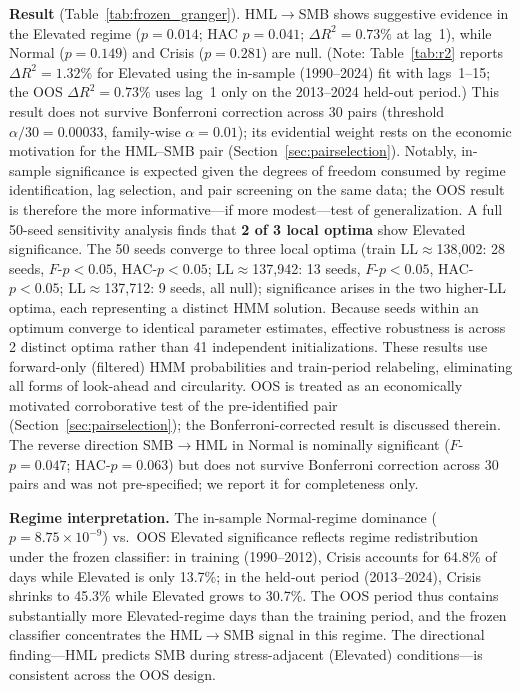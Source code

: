 \documentclass[sigconf,anonymous]{acmart}
\begin{document}
\textbf{Result} (Table~\ref{tab:frozen_granger}). HML$\to$SMB shows suggestive evidence in the Elevated regime
($p = 0.014$; HAC $p = 0.041$; $\Delta R^2 = 0.73\%$ at lag~1),
while Normal ($p = 0.149$) and Crisis ($p = 0.281$) are null.
(Note: Table~\ref{tab:r2} reports $\Delta R^2 = 1.32\%$ for Elevated using the
in-sample (1990--2024) fit with lags~1--15; the OOS $\Delta R^2 = 0.73\%$ uses
lag~1 only on the 2013--2024 held-out period.)
This result does not survive Bonferroni correction across 30 pairs
(threshold $\alpha/30 = 0.00033$, family-wise $\alpha = 0.01$); its evidential weight
rests on the economic motivation for the HML--SMB pair
(Section~\ref{sec:pairselection}).
Notably, in-sample significance is expected given the degrees of freedom consumed
by regime identification, lag selection, and pair screening on the same data;
the OOS result is therefore the more informative---if more modest---test of
generalization.
A full 50-seed sensitivity
analysis finds that \textbf{2 of 3 local optima} show Elevated significance.
The 50 seeds converge to three local optima (train LL$\approx$138,002: 28 seeds,
$F$-$p < 0.05$, HAC-$p < 0.05$; LL$\approx$137,942: 13 seeds,
$F$-$p < 0.05$, HAC-$p < 0.05$; LL$\approx$137,712: 9 seeds, all null);
significance arises in the two higher-LL optima, each representing a distinct
HMM solution. Because seeds within an optimum converge to identical parameter estimates,
effective robustness is across 2 distinct optima rather than 41 independent initializations.
These results use forward-only (filtered)
HMM probabilities and train-period relabeling, eliminating all forms
of look-ahead and circularity.
OOS is treated as an economically motivated corroborative test of the pre-identified pair
(Section~\ref{sec:pairselection}); the Bonferroni-corrected result is discussed therein.
The reverse direction SMB$\to$HML in Normal is nominally significant ($F$-$p = 0.047$;
HAC-$p = 0.063$) but does not survive Bonferroni correction across 30 pairs and was
not pre-specified; we report it for completeness only.

\textbf{Regime interpretation.} The in-sample Normal-regime dominance
($p = 8.75 \times 10^{-9}$) vs.\ OOS Elevated significance reflects
regime redistribution under the frozen classifier: in training (1990--2012),
Crisis accounts for 64.8\% of days while Elevated is only 13.7\%;
in the held-out period (2013--2024), Crisis shrinks to 45.3\% while
Elevated grows to 30.7\%. The OOS period thus contains substantially more
Elevated-regime days than the training period, and the frozen classifier
concentrates the HML$\to$SMB signal in this regime.
The directional finding---HML predicts SMB during stress-adjacent
(Elevated) conditions---is consistent across the OOS design.
\end{document}
